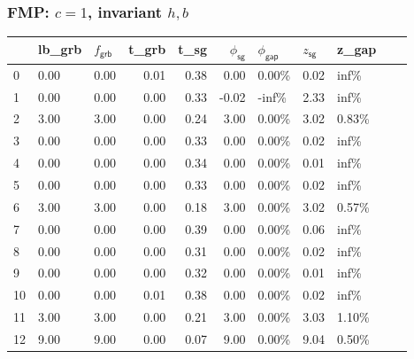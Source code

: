 \begin{frame}
  \frametitle{FMP: \(c=1\), invariant \(h, b\)}
  \scriptsize
  \begin{tabular}{lllrrrlllll}
    \toprule
    {} & lb\_grb              & \(f_{\textsf{grb}}\)   & t\_grb
       & t\_sg                & \(\phi_{\textsf{sg}}\) & \(\phi_{\textsf{gap}}\)
       & \( z_{\textsf{sg}}\) & z\_gap                                                                                   \\
    \midrule
    0  & 0.00                 & 0.00                   & 0.01                    & 0.38 & 0.00  & 0.00\% & 0.02 & inf\%  \\
    1  & 0.00                 & 0.00                   & 0.00                    & 0.33 & -0.02 & -inf\% & 2.33 & inf\%  \\
    2  & 3.00                 & 3.00                   & 0.00                    & 0.24 & 3.00  & 0.00\% & 3.02 & 0.83\% \\
    3  & 0.00                 & 0.00                   & 0.00                    & 0.33 & 0.00  & 0.00\% & 0.02 & inf\%  \\
    4  & 0.00                 & 0.00                   & 0.00                    & 0.34 & 0.00  & 0.00\% & 0.01 & inf\%  \\
    5  & 0.00                 & 0.00                   & 0.00                    & 0.33 & 0.00  & 0.00\% & 0.02 & inf\%  \\
    6  & 3.00                 & 3.00                   & 0.00                    & 0.18 & 3.00  & 0.00\% & 3.02 & 0.57\% \\
    7  & 0.00                 & 0.00                   & 0.00                    & 0.39 & 0.00  & 0.00\% & 0.06 & inf\%  \\
    8  & 0.00                 & 0.00                   & 0.00                    & 0.31 & 0.00  & 0.00\% & 0.02 & inf\%  \\
    9  & 0.00                 & 0.00                   & 0.00                    & 0.32 & 0.00  & 0.00\% & 0.01 & inf\%  \\
    10 & 0.00                 & 0.00                   & 0.01                    & 0.38 & 0.00  & 0.00\% & 0.02 & inf\%  \\
    11 & 3.00                 & 3.00                   & 0.00                    & 0.21 & 3.00  & 0.00\% & 3.03 & 1.10\% \\
    12 & 9.00                 & 9.00                   & 0.00                    & 0.07 & 9.00  & 0.00\% & 9.04 & 0.50\% \\

\end{tabular}
\end{frame}
